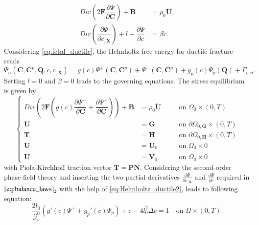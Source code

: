 \begin{equation} \label{eq:balance_laws}
	\begin{aligned}
		Div\left(2\mathbf{F}\dfrac{\partial\Psi}{\partial\mathbf{C}}\right)+\mathbf{B} &= \rho_{0}\ddot{\mathbf{U}}, \\
		Div\left(\dfrac{\partial\Psi}{\partial c_{,\mathbf{X}}}\right)+l-\dfrac{\partial\Psi}{\partial c} &= \beta\dot{c}.
	\end{aligned}
\end{equation}
Considering \eqref{eq:fctal_ductile}, the Helmholtz free energy for ductile fracture reads
\begin{equation} \label{eq:Helmholtz_ductile2}
	\Psi_{n}\left(\mathbf{C},\mathbf{C}^{p},\mathbf{Q},c,c_{,\mathbf{X}}\right) = g\left(c\right)\Psi^{+}\left(\mathbf{C},\mathbf{C}^{p}\right)+\Psi^{-}\left(\mathbf{C},\mathbf{C}^{p}\right)+g_{p}\left(c\right)\Psi_{p}\left(\mathbf{Q}\right)+\Gamma_{c,n}.
\end{equation}
Setting $l=0$ and $\beta=0$ leads to the governing equations. The stress equilibrium is given by
\begin{equation} \label{eq:stress_equil_ductile}
	 \left\{\begin{alignedat}{2}
		Div\left(2\mathbf{F}\left(g\left(c\right)\dfrac{\partial\Psi^{+}}{\partial\mathbf{C}}+\dfrac{\partial\Psi^{-}}{\partial\mathbf{C}}\right)\right)+\mathbf{B} &= \rho_{0}\ddot{\mathbf{U}} && \quad\text{on } \Omega_{0}\times\left(0,T\right) \\
		\mathbf{U} &= \mathbf{G} && \quad\text{on } \partial\Omega_{0,\mathbf{G}}\times\left(0,T\right) \\
		\mathbf{T} &= \mathbf{H} && \quad\text{on } \partial\Omega_{0,\mathbf{H}}\times\left(0,T\right) \\
		\mathbf{U} &= \mathbf{U}_{0} && \quad\text{on } \Omega_{0}\times0 \\
		\dot{\mathbf{U}} &= \mathbf{V}_{0} && \quad\text{on } \Omega_{0}\times0
  \end{alignedat}\right.
\end{equation}
with Piola-Kirchhoff traction vector $\mathbf{T}=\mathbf{P}\mathbf{N}$. Considering the second-order phase-field theory and inserting the two partial derivatives $\frac{\partial\Psi}{\partial c_{,\mathbf{X}}}$ and $\frac{\partial\Psi}{\partial c}$ required in $\eqref{eq:balance_laws}_{2}$ with the help of \eqref{eq:Helmholtz_ductile2}, leads to following equation:
\begin{equation} \label{eq:c2_ph_evolution_tmp}
\dfrac{2l_{0}}{\mathcal{G}_{c}^{0}}\left(g'\left(c\right)\Psi^{+}+g_{p}'\left(c\right)\Psi_{p}\right) + c - 4l_{0}^{2}\Delta c = 1 \quad\text{on } \Omega\times\left(0,T\right).
\end{equation}
